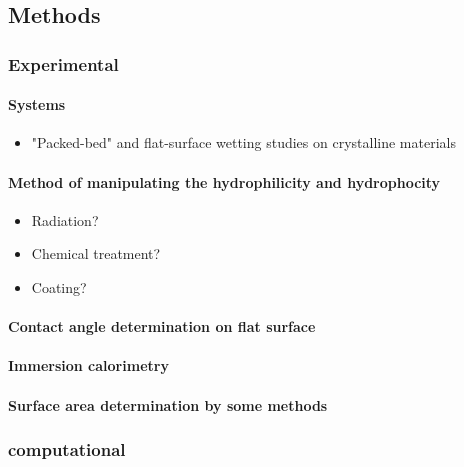 \documentclass[a4paper,12pt,single,pdftex]{scrartcl}
\begin{document}
\label{ID_1509493354}\subsection{Methods}

\label{ID_176697614}\subsubsection{Experimental}

\label{ID_222214319}\paragraph{Systems}

\begin{itemize}
\label{ID_890750199}\item "Packed-bed" and flat-surface wetting studies on crystalline materials
\end{itemize}
\label{ID_890750199}\label{ID_1528992532}\paragraph{Method of manipulating the hydrophilicity and hydrophocity}

\begin{itemize}
\label{ID_630039349}\item Radiation?
\label{ID_1162892636}\item Chemical treatment?
\label{ID_1113661769}\item Coating?
\end{itemize}
\label{ID_630039349}\label{ID_1162892636}\label{ID_1113661769}\label{ID_768785223}\paragraph{Contact angle determination on flat surface}

\label{ID_1121131843}\paragraph{Immersion calorimetry}

\label{ID_627706002}\paragraph{Surface area determination by some methods}

\label{ID_872435313}\subsubsection{computational}
\end{document}
